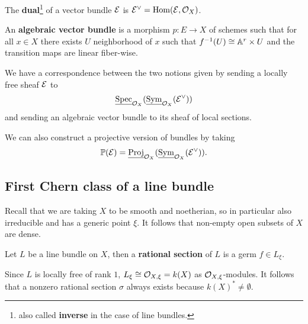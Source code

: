 \begin{definition}[]
The \textbf{dual}\footnote{also called \textbf{inverse} in the case of line bundles.} of a vector bundle $\mathcal{E}$ is $\mathcal{E}^\vee=\operatorname{Hom}(\mathcal{E},\mathcal{O}_X)$.
\end{definition}

\begin{definition}[]
An \textbf{algebraic vector bundle} is a morphism $p:E\to X$ of schemes such that for all $x\in X$ there exists $U$ neighborhood of $x$ such that $f^{-1}(U)\cong \mathbb{A}^r\times U$ and the transition maps are linear fiber-wise.
\end{definition}

\begin{remark}
We have a correspondence between the two notions given by sending a locally free sheaf $\mathcal{E}$ to 
\[\underline{\operatorname{Spec}}_{\mathcal{O}_X}(\underline{\operatorname{Sym}}_{\mathcal{O}_X}(\mathcal{E}^\vee))\]
and sending an algebraic vector bundle to its sheaf of local sections.

We can also construct a projective version of bundles by taking
\[\mathbb{P}(\mathcal{E})=\underline{\operatorname{Proj}}_{\mathcal{O}_X}(\underline{\operatorname{Sym}}_{\mathcal{O}_X}(\mathcal{E}^\vee)).\]
\end{remark}




\subsection{First Chern class of a line bundle}

Recall that we are taking $X$ to be smooth and noetherian, so in particular also irreducible and has a generic point $\xi$. It follows that non-empty open subsets of $X$ are dense.


\begin{definition}[]
Let $L$ be a line bundle on $X$, then a \textbf{rational section} of $L$ is a germ $f\in L_\xi$.
\end{definition}


\begin{remark}
Since $L$ is locally free of rank $1$, $L_\xi\cong \mathcal{O}_{X,\xi}=k(X)$ as $\mathcal{O}_{X,\xi}$-modules. It follows that a nonzero rational section $\sigma$ always exists because $k(X)^\ast\neq \emptyset$. 
\end{remark}

